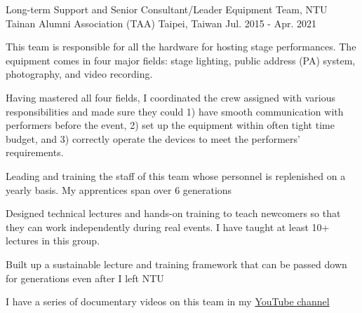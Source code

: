 

\begin{cventries}
  \cventry
    {Long-term Support and Senior Consultant/Leader} %
    {Equipment Team, NTU Tainan Alumni Association (TAA)} %
    {Taipei, Taiwan} %
    {Jul. 2015 - Apr. 2021} %
    {
        \begin{cvitems} %
        \item This team is responsible for all the hardware for hosting stage performances. The equipment comes in four major fields: stage lighting, public address (PA) system, photography, and video recording. 
        \item Having mastered all four fields, I coordinated the crew assigned with various responsibilities and made sure they could 1) have smooth communication with performers before the event, 2) set up the equipment within often tight time budget, and 3) correctly operate the devices to meet the performers' requirements.
        \item Leading and training the staff of this team whose personnel is replenished on a yearly basis. My apprentices span over 6 generations
        \item Designed technical lectures and hands-on training to teach newcomers so that they can work independently during real events. I have taught at least 10+ lectures in this group.
        \item Built up a sustainable lecture and training framework that can be passed down for generations even after I left NTU
        \item I have a series of documentary videos on this team in my \href{https://www.youtube.com/channel/UCI6m_87ud6TXVhVh4o-NOMg}{YouTube channel}
        \end{cvitems}
    }


\end{cventries}
